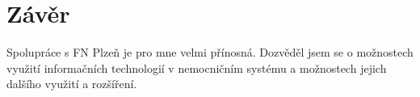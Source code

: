 \setlength{\parskip}{1em}

\chapter*{Závěr}

Spolupráce s FN Plzeň je pro mne velmi přínosná. Dozvěděl jsem se o možnostech využití informačních technologií v nemocničním systému a možnostech jejich dalšího využití a rozšíření.